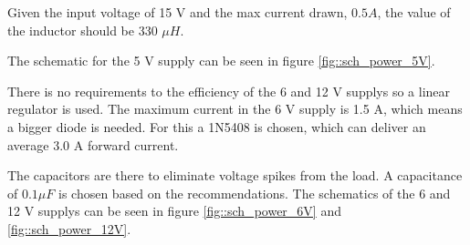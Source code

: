 Given the input voltage of 15 V and the max current drawn, $0.5 A$, the value of the inductor should be 330 $\mu H$\cite[p. 14]{ds:LM2574N}.

The schematic for the 5 V supply can be seen in figure \ref{fig::sch_power_5V}.

There is no requirements to the efficiency of the 6 and 12 V supplys so a linear regulator is used.
The maximum current in the 6 V supply is 1.5 A, which means a bigger diode is needed.
For this a 1N5408 is chosen, which can deliver an average 3.0 A forward current\cite[p. 1]{ds:1N5408}.

The capacitors are there to eliminate voltage spikes from the load. A capacitance of $0.1 \mu F$ is chosen based on the recommendations\cite[p. 702]{book:prac_ele}.
The schematics of the 6 and 12 V supplys can be seen in figure \ref{fig::sch_power_6V} and \ref{fig::sch_power_12V}.

